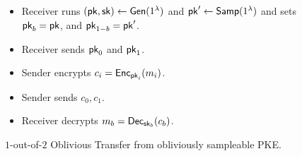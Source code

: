 \begin{figure}[h]
	\begin{mdframed}[
		linecolor=black,
		linewidth=1pt,
		roundcorner=5pt,
		backgroundcolor=white,
		userdefinedwidth=\textwidth,
		]
		\vspace{2mm}
		\begin{itemize}
			\item Receiver runs $(\mathsf{pk},\mathsf{sk})\gets\mathsf{Gen}(1^\lambda)$ and $\mathsf{pk}'\gets\mathsf{Samp}(1^\lambda)$ and sets $\mathsf{pk}_b=\mathsf{pk}$, and $\mathsf{pk}_{1-b}=\mathsf{pk}'$.
			\item Receiver sends $\mathsf{pk}_0$ and $\mathsf{pk}_1$.
			\item Sender encrypts $c_i=\mathsf{Enc}_{\mathsf{pk}_i}(m_i)$.
			\item Sender sends $c_0, c_1$.
			\item Receiver decrypts $m_b = \mathsf{Dec}_{\mathsf{sk}_b}(c_b)$.
		\end{itemize}
		\vspace{2mm}
	\end{mdframed}
	\caption{$1$-out-of-$2$ Oblivious Transfer from obliviously sampleable PKE.}
	\label{fig:piot}
\end{figure}